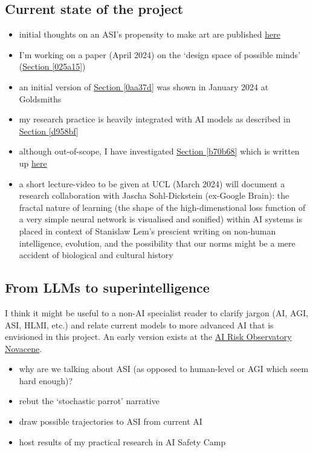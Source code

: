 \documentclass{article}
\begin{document}
\subsection{Current state of the project}
\begin{itemize}
\item initial thoughts on an ASI's propensity to make art are published \href{https://wiki.ljudmila.org/Kanad_Chakrabarti:_After_Interregnum,_Indra%27s_Net}{here}
\item I'm working on a paper (April 2024) on the `design space of possible minds' (\hyperref[025a15]{Section \ref*{025a15}})
\item an initial version of \hyperref[0aa37d]{Section \ref*{0aa37d}} was shown in January 2024 at Goldsmiths
\item my research practice is heavily integrated with AI models as described in \hyperref[d958bf]{Section \ref*{d958bf}}
\item although out-of-scope, I have investigated \hyperref[b70b68]{Section \ref*{b70b68}} which is written up \href{https://www.lesswrong.com/posts/HaGTQcxqjHPyR9Ju6/unpicking-extinction}{here}
\item a short lecture-video to be given at UCL (March 2024) will document a research collaboration with Jascha Sohl-Dickstein (ex-Google Brain): the fractal nature of learning (the shape of the high-dimenstional loss function of a very simple neural network is visualised and sonified) within AI systems is placed in context of Stanislaw Lem's prescient writing on non-human intelligence, evolution, and the possibility that our norms might be a mere accident of biological and cultural history
\end{itemize}


\subsection{From LLMs to superintelligence}

\label{77220f}

I think it might be useful to a non-AI specialist reader to clarify jargon (AI, AGI, ASI, HLMI, etc.) and relate current models to more advanced AI that is envisioned in this project.  An early version exists at the \href{http://airo-ne.org/site/home.html}{AI Risk Observatory Novacene}.
\begin{itemize}
\item why are we talking about ASI (as opposed to human-level or AGI which seem hard enough)?
\item rebut the `stochastic parrot' narrative
\item draw possible trajectories to ASI from current AI
\item host results of my practical research in AI Safety Camp
\end{itemize}
\end{document}
